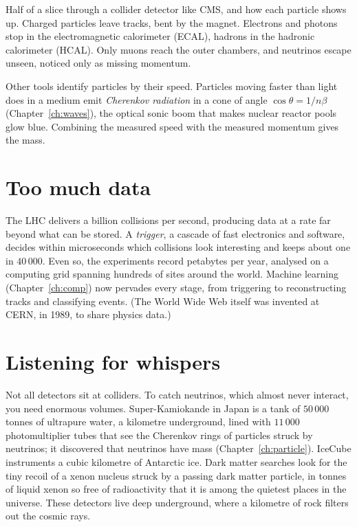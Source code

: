 \begin{center}
\begin{minipage}{\linewidth}
{\small Half of a slice through a collider detector like CMS, and how each particle shows up. Charged particles leave tracks, bent by the magnet. Electrons and photons stop in the electromagnetic calorimeter (ECAL), hadrons in the hadronic calorimeter (HCAL). Only muons reach the outer chambers, and neutrinos escape unseen, noticed only as missing momentum.}
\end{minipage}
\end{center}

Other tools identify particles by their speed. Particles moving faster than light does in a medium emit \emph{Cherenkov radiation} in a cone of angle $\cos\theta = 1/n\beta$ (Chapter~\ref{ch:waves}), the optical sonic boom that makes nuclear reactor pools glow blue. Combining the measured speed with the measured momentum gives the mass.

\section{Too much data}

The LHC delivers a billion collisions per second, producing data at a rate far beyond what can be stored. A \emph{trigger}, a cascade of fast electronics and software, decides within microseconds which collisions look interesting and keeps about one in $40\,000$. Even so, the experiments record petabytes per year, analysed on a computing grid spanning hundreds of sites around the world. Machine learning (Chapter~\ref{ch:comp}) now pervades every stage, from triggering to reconstructing tracks and classifying events. (The World Wide Web itself was invented at CERN, in 1989, to share physics data.)

\section{Listening for whispers}

Not all detectors sit at colliders. To catch neutrinos, which almost never interact, you need enormous volumes. Super-Kamiokande in Japan is a tank of $50\,000$ tonnes of ultrapure water, a kilometre underground, lined with $11\,000$ photomultiplier tubes that see the Cherenkov rings of particles struck by neutrinos; it discovered that neutrinos have mass (Chapter~\ref{ch:particle}). IceCube instruments a cubic kilometre of Antarctic ice. Dark matter searches look for the tiny recoil of a xenon nucleus struck by a passing dark matter particle, in tonnes of liquid xenon so free of radioactivity that it is among the quietest places in the universe. These detectors live deep underground, where a kilometre of rock filters out the cosmic rays.

